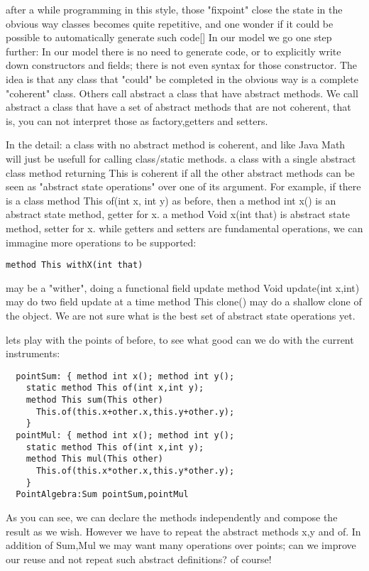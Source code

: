 \noindent after a while programming in this style, those "fixpoint" close the state in
the obvious way classes becomes quite repetitive, and one wonder
if it could be possible to automatically generate such code[]
In our model we go one step further:
In our model there is no need to generate code, or to explicitly
write down constructors and fields; there is not even syntax for those
constructor.
The idea is that any class that "could" be completed in the obvious way
is a complete "coherent" class.
Others call abstract a class that have abstract methods.
We call abstract a class that have a set of abstract methods that are not
coherent, that is, you can not interpret those as factory,getters and setters.
  
In the detail: a class with no abstract method is coherent, and like Java Math
will just be usefull for calling class/static methods.
a class with a single abstract class method returning This
is coherent if all the other abstract methods can be seen as "abstract state
operations" over one of its argument.
For example,
if there is a class method This of(int x, int y) as before,
then
a method int x() is an abstract state method, getter for x.
a method Void x(int that) is abstract state method, setter for x.
while getters and setters are fundamental operations, we can immagine
more operations to be supported:

\begin{lstlisting}
method This withX(int that) 
\end{lstlisting}
may be a "wither", doing a functional field update
  method Void update(int x,int) may do two field update at a time
  method This clone() may do a shallow clone of the object.
  We are not sure what is the best set of abstract state operations yet.
  
  
  lets play with the points of before, to see what good can we do with the current
  instruments:

\begin{lstlisting}
  pointSum: { method int x(); method int y();
    static method This of(int x,int y);
    method This sum(This other)
      This.of(this.x+other.x,this.y+other.y);
    }
  pointMul: { method int x(); method int y();
    static method This of(int x,int y);
    method This mul(This other)
      This.of(this.x*other.x,this.y*other.y);
    }
  PointAlgebra:Sum pointSum,pointMul
\end{lstlisting}  

  As you can see, we can declare the methods independently and compose the result
  as we wish. However we have to repeat the abstract methods x,y and of.
  In addition of Sum,Mul we may want many operations over points; can we improve our reuse
  and not repeat such abstract definitions? of course!

